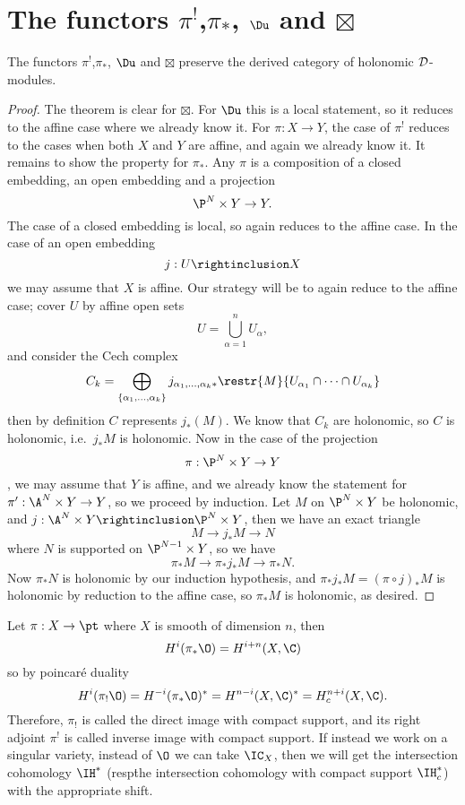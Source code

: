 \documentclass[etingof-dmod.tex]{subfiles}
\begin{document}
\section{The functors $\pi^!$,$\pi_*$, $\Du$ and $\boxtimes$}
\begin{thm}
  The functors $\pi^!$,$\pi_*$, $\Du$ and $\boxtimes$ preserve the derived
  category of holonomic $\mathcal{D}$-modules.
\end{thm}
\begin{proof}
  The theorem is clear for $\boxtimes$. For $\Du$ this is a local statement, so
  it reduces to the affine case where we already know it. For $\pi: X
  \rightarrow Y$, the case of $\pi^!$ reduces to the cases when both $X$ and $Y$
  are affine, and again we already know it. It remains to show the property for
  $\pi_*$. Any $\pi$ is a composition of a closed embedding, an open embedding
  and a projection $$\P^N\times Y \rightarrow Y.$$ The case of a closed
  embedding is local, so again reduces to the affine case. In the case of an open
  embedding $$j : U \rightinclusion X$$ we may assume that $X$ is affine. Our
  strategy will be to again reduce to the affine case; cover $U$ by affine open
  sets$$U = \bigcup_{\alpha=1}^n U_{\alpha},$$ and consider the Cech complex
  $$C_k = \bigoplus_{\{\alpha_1,
  \ldots, \alpha_k\}} j_{\alpha_1,\ldots,\alpha_k *}
  \restr{M}{U_{\alpha_1}\cap\cdots\cap U_{\alpha_k}}$$ then by definition $C$
    represents $j_*(M)$. We know that $C_k$ are holonomic, so $C$ is holonomic,
    i.e.\ $j_* M$ is holonomic. Now in the case of the projection $$\pi: \P^N
    \times Y \rightarrow Y$$, we may assume that $Y$ is affine, and we already
    know the statement for $\pi' : \A^N \times Y \rightarrow Y$, so we proceed
    by induction. Let $M$ on $\P^N \times Y$ be holonomic, and $j: \A^N \times Y
    \rightinclusion \P^N \times Y$, then we have an exact triangle $$M
    \rightarrow j_*M \rightarrow N$$ where $N$ is supported on $\P^{N-1}\times
    Y$, so we have $$\pi_* M \rightarrow \pi_* j_* M \rightarrow \pi_*
    N.$$ Now $\pi_*N$ is holonomic by our induction hypothesis, and $\pi_* j_* M
    = (\pi \circ j)_* M$ is holonomic by reduction to the affine case, so $\pi_*
    M$ is holonomic, as desired.
\end{proof}

\begin{rmk}
  Let $\pi: X \rightarrow \pt$ where $X$ is smooth of dimension $n$, then
  $$H^i(\pi_*\O) = H^{i+n}(X,\C)$$ so by poincar\'e duality $$H^i(\pi_!\O) =
  H^{-i}(\pi_*\O)^* = H^{n-i}(X,\C)^* = H_c^{n+i}(X,\C).$$ Therefore, $\pi_!$ is
  called the direct image with compact support, and its right adjoint $\pi^!$ is
  called inverse image with compact support. If instead we work on a singular
  variety, instead of $\O$ we can take $\IC_X$, then we will get the
  intersection cohomology $\IH^*$ (resp\. the intersection cohomology with
  compact support $\IH_c^*$) with the appropriate shift.
\end{rmk}
\end{document}
